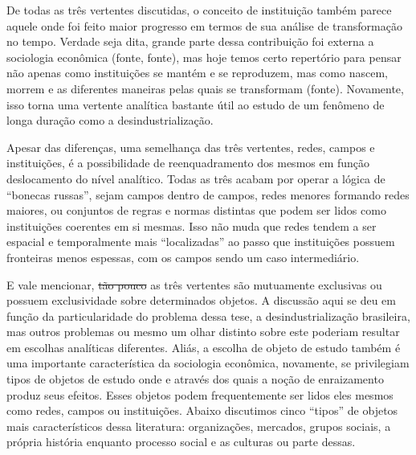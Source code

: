 De todas as três vertentes discutidas, o conceito de instituição também parece
aquele onde foi feito maior progresso em termos de sua análise de transformação no tempo. Verdade seja dita, grande parte dessa contribuição foi externa a sociologia econômica (fonte, fonte), mas hoje temos certo repertório para pensar não apenas como instituições
se mantém e se reproduzem, mas como nascem, morrem e as diferentes maneiras pelas quais se transformam (fonte). Novamente, isso torna uma vertente analítica bastante útil ao estudo de um fenômeno de longa duração como a desindustrialização.


Apesar das diferenças, uma semelhança das três vertentes, redes, campos e instituições, é a possibilidade de reenquadramento dos mesmos em função  deslocamento do nível analítico. Todas as três acabam por operar a lógica de ``bonecas russas'', sejam campos dentro de campos, redes menores formando redes maiores, ou conjuntos de regras e normas distintas que podem ser lidos como instituições coerentes em si mesmas. Isso não muda que redes tendem a ser espacial e temporalmente mais ``localizadas'' ao passo que instituições possuem fronteiras menos espessas, com os campos sendo um caso intermediário.

E vale mencionar, \sout{tão pouco} as três vertentes são mutuamente exclusivas ou possuem exclusividade sobre determinados objetos. A discussão aqui se deu em função da particularidade do problema dessa tese, a desindustrialização brasileira, mas outros problemas ou mesmo
um olhar distinto sobre este poderiam resultar em escolhas analíticas diferentes. Aliás, a escolha de objeto de estudo também é uma importante característica da sociologia econômica, novamente, se privilegiam tipos de objetos de estudo onde e através dos quais a noção de enraizamento produz seus efeitos. Esses objetos podem frequentemente ser lidos eles mesmos como redes, campos ou instituições. Abaixo discutimos cinco ``tipos'' de objetos mais característicos dessa literatura: organizações, mercados, grupos sociais, a própria história enquanto processo social e as culturas ou parte dessas.


